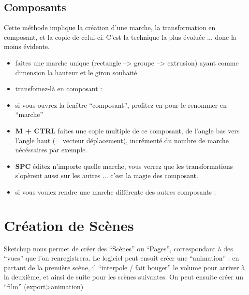 \documentclass[a4paper,12pt,french]{sphinxmanual}
\begin{document}
\subsection{Composants}
\label{su/escalier:composants}
Cette méthode implique la création d'une marche, la transformation en composant, et la copie de celui-ci. C'est la technique la plus évoluée ... donc la moins évidente.
\begin{itemize}
\item {} 
faites une marche unique (rectangle --\textgreater{} groupe --\textgreater{} extrusion) ayant comme dimension la hauteur et le giron souhaité

\item {} 
transfomez-là en composant : 

\item {} 
si vous ouvrez la fenêtre ``composant'', profitez-en pour le renommer en ``marche''

\item {} 
\textbf{M + CTRL} faites une copie multiple de ce composant, de l'angle bas vers l'angle haut (= vecteur déplacement), incrémenté du nombre de marche nécéssaires  par exemple.

\item {} 
\textbf{SPC} éditez n'importe quelle marche, vous verrez que les transformations s'opèrent aussi sur les autres ... c'est la magie des composant.

\item {} 
si vous voulez rendre une marche différente des autres composants : 

\end{itemize}


\section{Création de Scènes}
\label{su/creation-scenes:creation-scenes}\label{su/creation-scenes::doc}\label{su/creation-scenes:creation-de-scenes}
Sketchup nous permet de créer des ``Scènes'' ou ``Pages'', correspondant à des ``vues'' que l'on renregistrera. Le logiciel peut ensuit créer une ``animation'' : en partant de la première scène, il ``interpole / fait bouger'' le volume pour arriver à la deuxième, et ainsi de suite pour les scènes suivantes. On peut ensuite créer un ``film'' (export\textgreater{}animation)
\end{document}
